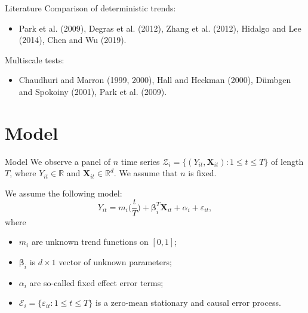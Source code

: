 \documentclass[10pt]{beamer}
\newcommand{\Eps}{\mathcal{E}}
\newcommand{\eps}{\varepsilon}
\newcommand{\reals}{\mathbb{R}}
\newcommand{\X}{\boldsymbol{X}}
\newcommand{\bfbeta}{\boldsymbol{\beta}}
\begin{document}
\begin{frame}{Literature}
	Comparison of deterministic trends:
	\begin{itemize}
		\item {Park et al. (2009)}, Degras et al. (2012), Zhang et al. (2012), Hidalgo and Lee (2014), Chen and Wu (2019).
	\end{itemize}\pause\pause
	Multiscale tests:
	\begin{itemize}
		\item Chaudhuri and Marron (1999, 2000), Hall and Heckman (2000), D{\"u}mbgen and Spokoiny (2001), {Park et al. (2009)}.
	\end{itemize}\pause
\end{frame}


\section{Model}

\begin{frame}{Model}
We observe a panel of $n$ time series $\mathcal{Z}_i = \{(Y_{it}, \X_{it}): 1 \le t \le T \}$ of length $T$, where $Y_{it} \in \reals$ and $\X_{it}\in \reals^{d}$. \pause We assume that $n$ is fixed. \pause

We assume the following model:
\begin{equation*}
Y_{it} = m_i \Big( \frac{t}{T} \Big) + \bfbeta_i^T\X_{it}+ \alpha_i + \varepsilon_{it},
\end{equation*}\pause
\vspace{-3mm}
where
\begin{itemize}
\item $m_i$ are unknown trend functions on $[0,1]$;\pause
\item $\bfbeta_i$ is $d\times 1$ vector of unknown parameters;\pause
\item $\alpha_i$ are so-called fixed effect error terms;\pause
\item $\Eps_i = \{\eps_{it}: 1\leq t \leq T\}$ is a zero-mean stationary and causal error process.
\end{itemize}
\end{frame}
\end{document}
